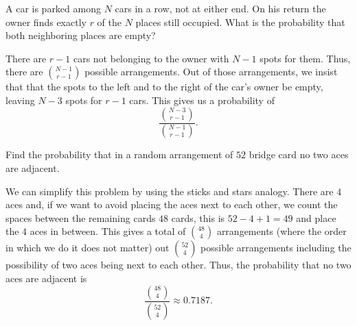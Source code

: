\begin{problem}[Handout 2, \# 15]
  A car is parked among \(N\) cars in a row, not at either end. On his
  return the owner finds exactly \(r\) of the \(N\) places still
  occupied. What is the probability that both neighboring places are empty?
\end{problem}
\begin{solution}
  There are \(r-1\) cars not belonging to the owner with \(N-1\) spots for
  them. Thus, there are \(\binom{N-1}{r-1}\) possible
  arrangements. Out of those arrangements, we insist that that the spots to
  the left and to the right of the car's owner be empty, leaving \(N-3\)
  spots for \(r-1\) cars. This gives us a probability of
  \[
    \frac{\binom{N-3}{r-1}}{\binom{N-1}{r-1}}.
  \]
\end{solution}
\newpage

\begin{problem}[Handout 2, \# 16]
  Find the probability that in a random arrangement of \(52\) bridge card
  no two aces are adjacent.
\end{problem}
\begin{solution}
  We can simplify this problem by using the sticks and stars analogy. There
  are \(4\) aces and, if we want to avoid placing the aces next to each
  other, we count the spaces between the remaining cards \(48\) cards, this
  is \(52-4+1=49\) and place the \(4\) aces in between. This gives a total
  of \(\binom{48}{4}\) arrangements (where the order in which
  we do it does not matter) out \(\binom{52}{4}\) possible
  arrangements including the possibility of two aces being next to each
  other. Thus, the probability that no two aces are adjacent is
  \[
    \frac{\binom{48}{4}}{\binom{52}{4}}\approx 0.7187.
  \]
\end{solution}
\newpage

